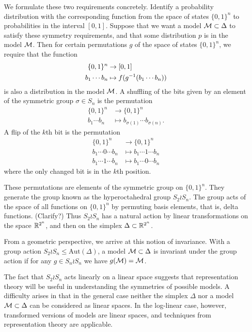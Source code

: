 \documentclass[cclicense]{hmcthesis}
\numberwithin{equation}{chapter}
\numberwithin{thmcounter}{chapter}
\begin{document}
    We formulate these two requirements concretely.  Identify a probability
    distribution with the corresponding function from the space of states $\{0,
    1\}^n$ to probabilities in the interval $[0, 1]$.  Suppose that we want a
    model $\mathcal{M} \subset \Delta$ to satisfy these symmetry requirements, and that
    some distribution $p$ is in the model $\mathcal{M}$.  Then for certain permutations
    $g$ of the space of states $\{0, 1\}^n$, we require that
    the function
    \begin{align*}
        \{0, 1\}^n &\to [0, 1] \\
        b_1 \cdots b_n &\mapsto f(g^{-1}(b_1 \cdots b_n))
    \end{align*}
    is also a distribution in the model $\mathcal{M}$.  A shuffling of the bits given
    by an element of the symmetric group $\sigma \in S_n$ is the permutation
    \begin{align*}
        \{0, 1\}^n &\to \{0, 1\}^n \\
        b_1 \cdots b_n &\mapsto b_{\sigma(1)} \cdots b_{\sigma(n)}.
    \end{align*}
    A flip of the $k$th bit is the permutation
    \begin{align*}
        \{0, 1\}^n &\to \{0, 1\}^n \\
        b_1 \cdots 0 \cdots b_n 
        &\mapsto
        b_1 \cdots 1 \cdots b_n  \\
        b_1 \cdots 1 \cdots b_n 
        &\mapsto
        b_1 \cdots 0 \cdots b_n
    \end{align*}
    where the only changed bit is in the $k$th position.

    These permutations are elements of the symmetric group on $\{0, 1\}^n$.
    They generate the group known as the hyperoctahedral group $S_2 \wr S_n$.
    The group acts of the space of all functions on $\{0, 1\}^n$ by permuting
    basis elements, that is, delta functions.  (Clarify?)  Thus $S_2 \wr S_n$
    has a natural action by linear transformations on the space $\mathbb{R}^{2^n}$, and
    then on the simplex $\Delta \subset \mathbb{R}^{2^n}$.  
    
    From a geometric perspective, we arrive at this notion of invariance.  With
    a group action $S_2 \wr S_n \le \mathrm{Aut}(\Delta)$, a model $\mathcal{M} \subset
    \Delta$ is invariant under the group action if for any $g \in S_n \wr S_n$
    we have $g(\mathcal{M}) = \mathcal{M}$.

    The fact that $S_2 \wr S_n$ acts linearly on a linear space suggests that
    representation theory will be useful in understanding the symmetries of
    possible models.  A difficulty arises in that in the general case neither
    the simplex $\Delta$ nor a model $\mathcal{M} \subset \Delta$ can be considered as
    linear spaces.  In the log-linear case, however, transformed versions of
    models are linear spaces, and techniques from representation theory are
    applicable.
\end{document}
